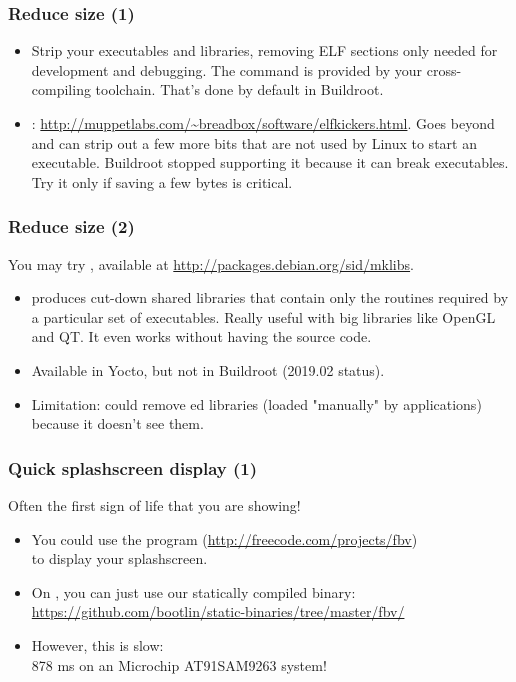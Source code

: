 \begin{frame}
\frametitle{Reduce size (1)}
\begin{itemize}
	\item Strip your executables and libraries, removing ELF sections
		only needed for development and debugging. The 
		command is provided by your cross-compiling toolchain.
		That's done by default in Buildroot.
	\item {}:
		\url{http://muppetlabs.com/~breadbox/software/elfkickers.html}.
		Goes beyond  and can strip out a few more bits
		that are not used by Linux to start an executable.
		Buildroot stopped supporting it because it can break
	        executables. Try it only if saving a few bytes is
		critical.
\end{itemize}
\end{frame}

\begin{frame}
\frametitle{Reduce size (2)}
You may try , available at \url{http://packages.debian.org/sid/mklibs}.
\begin{itemize}
	\item {} produces cut-down shared libraries that contain
	only the routines required by a particular set of executables.
	Really useful with big libraries like OpenGL and QT. It even
	works without having the source code.
	\item Available in Yocto, but not in Buildroot (2019.02 status).
        \item Limitation:  could remove ed libraries
        (loaded "manually" by applications) because it doesn't see them.
\end{itemize}
\end{frame}

\begin{frame}
\frametitle{Quick splashscreen display (1)}
Often the first sign of life that you are showing!
\begin{itemize}
\item You could use the  program
      (\url{http://freecode.com/projects/fbv})\\
      to display your splashscreen.
\item On , you can just use our statically compiled
      binary: {\tiny
\url{https://github.com/bootlin/static-binaries/tree/master/fbv/}}
\item However, this is slow:\\
      878 ms on an Microchip AT91SAM9263 system!
\end{itemize}
\end{frame}

